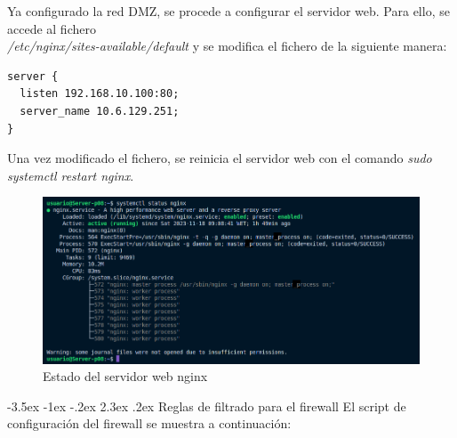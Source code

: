\documentclass[11pt]{report} %
\makeatletter
\renewcommand\chapter{\@startsection{chapter}{0}{\z@}%
    {-3.5ex \@plus -1ex \@minus -.2ex}%
    {2.3ex \@plus.2ex}%
    {\normalfont\Large\bfseries}}
\makeatother
\begin{document}
Ya configurado la red DMZ, se procede a configurar el servidor web. Para ello, se accede al fichero \\
\emph{/etc/nginx/sites-available/default} y se modifica el fichero de la siguiente manera:

\begin{verbatim}
server {
  listen 192.168.10.100:80;
  server_name 10.6.129.251;
}
\end{verbatim}

Una vez modificado el fichero, se reinicia el servidor web con el comando \emph{sudo systemctl restart nginx}.

\begin{figure}[H]
  \centering
  \includegraphics[scale=0.4]{img/nginx_status.png}
  \caption{Estado del servidor web nginx}
  \label{fig:estado del servidor web nginx}
\end{figure}

\cleardoublepage

\chapter{Reglas de filtrado para el firewall}
El script de configuración del firewall se muestra a continuación:




\end{document}
